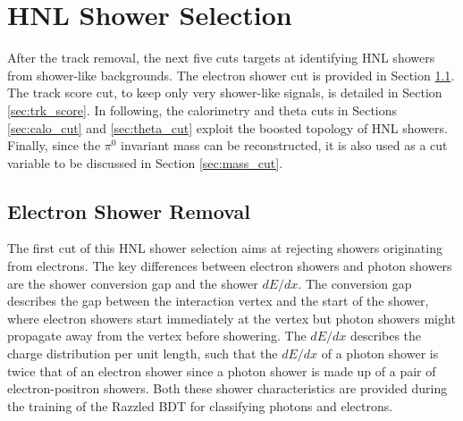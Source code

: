 \section{HNL Shower Selection}
\label{sec:hnl_shower_select}

After the track removal, the next five cuts targets at identifying HNL showers from shower-like backgrounds.
The electron shower cut is provided in Section \ref{sec:electron_removal}.
The track score cut, to keep only very shower-like signals, is detailed in Section \ref{sec:trk_score}.
In following, the calorimetry and theta cuts in Sections \ref{sec:calo_cut} and \ref{sec:theta_cut} exploit the boosted topology of HNL showers.
Finally, since the $\pi^0$ invariant mass can be reconstructed, it is also used as a cut variable to be discussed in Section \ref{sec:mass_cut}.

\subsection{Electron Shower Removal}
\label{sec:electron_removal}


The first cut of this HNL shower selection aims at rejecting showers originating from electrons.
The key differences between electron showers and photon showers are the shower conversion gap and the shower $dE/dx$.
The conversion gap describes the gap between the interaction vertex and the start of the shower, where electron showers start immediately at the vertex but photon showers might propagate away from the vertex before showering. 
The $dE/dx$ describes the charge distribution per unit length, such that the $dE/dx$ of a photon shower is twice that of an electron shower since a photon shower is made up of a pair of electron-positron showers.
Both these shower characteristics are provided during the training of the Razzled BDT for classifying photons and electrons. 

